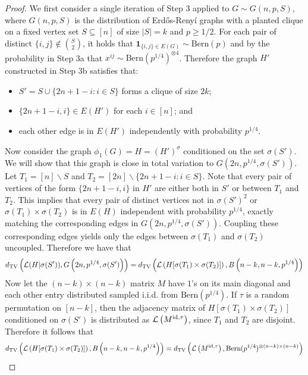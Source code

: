 \begin{proof}
We first consider a single iteration of Step 3 applied to $G \sim G(n, p, S)$, where $G(n, p, S)$ is the distribution of Erd\H{o}s-Reny\'{i} graphs with a planted clique on a fixed vertex set $S \subseteq [n]$ of size $|S| = k$ and $p \ge 1/2$. For each pair of distinct $\{i, j\} \not \in \binom{S}{2}$, it holds that $\mathbf{1}_{\{i, j\} \in E(G)} \sim \text{Bern}(p)$ and by the probability in Step 3a that $x^{ij} \sim \text{Bern}(p^{1/4})^{\otimes 4}$. Therefore the graph $H'$ constructed in Step 3b satisfies that:
\begin{itemize}
\item $S' = S \cup \{ 2n + 1 - i : i \in S\}$ forms a clique of size $2k$;
\item $\{2n + 1 - i, i\} \in E(H')$ for each $i \in [n]$; and
\item each other edge is in $E(H')$ independently with probability $p^{1/4}$.
\end{itemize}
Now consider the graph $\phi_1(G) = H = (H')^\sigma$ conditioned on the set $\sigma(S')$. We will show that this graph is close in total variation to $G(2n, p^{1/4}, \sigma(S'))$. Let $T_1 = [n] \backslash S$ and $T_2 = [2n]\backslash \{ 2n + 1 - i : i \in S\}$. Note that every pair of vertices of the form $\{2n + 1 - i, i\}$ in $H'$ are either both in $S'$ or between $T_1$ and $T_2$. This implies that every pair of distinct vertices not in $\sigma(S')^2$ or $\sigma(T_1) \times \sigma(T_2)$ is in $E(H)$ independent with probability $p^{1/4}$, exactly matching the corresponding edges in $G(2n, p^{1/4}, \sigma(S'))$. Coupling these corresponding edges yields only the edges between $\sigma(T_1)$ and $\sigma(T_2)$ uncoupled. Therefore we have that
$$d_{\text{TV}}\left( \mathcal{L}(H | \sigma(S')), G\left(2n, p^{1/4}, \sigma(S')\right) \right) = d_{\text{TV}}\left( \mathcal{L}\left(H[\sigma(T_1) \times \sigma(T_2)]\right), B\left(n - k, n - k, p^{1/4}\right) \right)$$
Now let the $(n - k) \times (n - k)$ matrix $M$ have $1$'s on its main diagonal and each other entry distributed sampled i.i.d. from $\text{Bern}(p^{1/4})$. If $\tau$ is a random permutation on $[n-k]$, then the adjacency matrix of $H[\sigma(T_1) \times \sigma(T_2)]$ conditioned on $\sigma(S')$ is distributed as $\mathcal{L}\left( M^{\text{id}, \tau} \right)$, since $T_1$ and $T_2$ are disjoint. Therefore it follows that
\begin{align*}
\TV\left( \mL\left(H[\sigma(T_1) \times \sigma(T_2)]\right), B\left(n - k, n - k, p^{1/4}\right) \right) &= \TV\left( \mL\left( M^{\text{id}, \tau} \right), \text{Bern}(p^{1/4})^{\otimes(n-k) \times (n-k)} \right) \\

\end{align*}
\end{proof}
